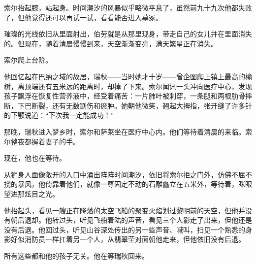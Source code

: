 \documentclass[AutoFakeBold=true]{book}
\begin{document}
\vspace*{1em}

索尔抬起膝，站起身。时间潮汐的风暴似乎略微平息了，虽然前九十九次他都失败了，但他觉得还可以再试一试，看看能否进入墓冢。

璀璨的光线依旧从里面射出，伯劳就是从那里现身，带走自己的女儿并在里面消失的。但现在，随着清晨慢慢到来，天空渐渐变亮，满天繁星正在消失。

索尔爬上台阶。

他回忆起在巴纳之域的故居，瑞秋——当时她才十岁——曾企图爬上镇上最高的榆树，离顶端还有五米远的距离时，却掉了下来。索尔闻讯一头冲向医疗中心，发现孩子飘浮在恢复性营养液中，经受着痛苦：一片肺叶被刺穿，一条腿和两根肋骨摔断，下巴断裂，还有无数割伤和瘀肿。她朝他微笑，翘起大拇指，张开缝了许多针的下颚说道：``下次我一定能成功！''

那晚，瑞秋进入梦乡时，索尔和萨莱坐在医疗中心内。他们等待着清晨的来临。索尔整夜都握着妻子的手。

现在，他也在等待。

从狮身人面像敞开的入口中涌出阵阵时间潮汐，依旧将索尔拒之门外，仿佛不屈不挠的暴风，他倚靠着他们，就像一尊固定不动的石雕矗立在五米外，等待着，眯眼望进那炫目之光。

他抬起头，看见一艘正在降落的太空飞船的聚变火焰划过黎明前的天空，但他并没有朝后退却。他转过头，听见飞船着陆的声音，看见三个人影走了出来，但他还是没有后退。他回过头，听见山谷深处传出的另一些声音、喊叫，扫见一个熟悉的身影好似消防员一样扛着另一个人，从翡翠茔对面朝他走来，但他依旧没有后退。

所有这些都和他的孩子无关。他在等瑞秋回来。

\vspace*{1em}
\end{document}
